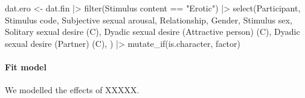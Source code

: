 \documentclass[
  bookmarksnumbered]{article}
\newenvironment{Shaded}{\begin{snugshade}}{\end{snugshade}}
\newcommand{\AttributeTok}[1]{\textcolor[rgb]{0.80,0.80,0.80}{#1}}
\newcommand{\FunctionTok}[1]{\textcolor[rgb]{0.94,0.94,0.56}{#1}}
\newcommand{\NormalTok}[1]{\textcolor[rgb]{0.80,0.80,0.80}{#1}}
\newcommand{\OtherTok}[1]{\textcolor[rgb]{0.94,0.94,0.56}{#1}}
\newcommand{\SpecialCharTok}[1]{\textcolor[rgb]{0.86,0.64,0.64}{#1}}
\newcommand{\StringTok}[1]{\textcolor[rgb]{0.80,0.58,0.58}{#1}}
\begin{document}
\begin{Shaded}
\begin{Highlighting}[]
\NormalTok{dat.ero }\OtherTok{\textless{}{-}}\NormalTok{ dat.fin }\SpecialCharTok{|\textgreater{}}
  \FunctionTok{filter}\NormalTok{(}\StringTok{\textasciigrave{}}\AttributeTok{Stimulus content}\StringTok{\textasciigrave{}} \SpecialCharTok{==} \StringTok{"Erotic"}\NormalTok{)  }\SpecialCharTok{|\textgreater{}} 
  \FunctionTok{select}\NormalTok{(Participant, }\StringTok{\textasciigrave{}}\AttributeTok{Stimulus code}\StringTok{\textasciigrave{}}\NormalTok{, }
         \StringTok{\textasciigrave{}}\AttributeTok{Subjective sexual arousal}\StringTok{\textasciigrave{}}\NormalTok{, }
\NormalTok{         Relationship, }
\NormalTok{         Gender, }
         \StringTok{\textasciigrave{}}\AttributeTok{Stimulus sex}\StringTok{\textasciigrave{}}\NormalTok{, }
         \StringTok{\textasciigrave{}}\AttributeTok{Solitary sexual desire (C)}\StringTok{\textasciigrave{}}\NormalTok{,}
         \StringTok{\textasciigrave{}}\AttributeTok{Dyadic sexual desire (Attractive person) (C)}\StringTok{\textasciigrave{}}\NormalTok{, }
         \StringTok{\textasciigrave{}}\AttributeTok{Dyadic sexual desire (Partner) (C)}\StringTok{\textasciigrave{}}\NormalTok{, ) }\SpecialCharTok{|\textgreater{}} 
  \FunctionTok{mutate\_if}\NormalTok{(is.character, factor)}
\end{Highlighting}
\end{Shaded}

\hypertarget{fit-model-1}{%
\paragraph{Fit model}\label{fit-model-1}}

We modelled the effects of XXXXX.
\end{document}
